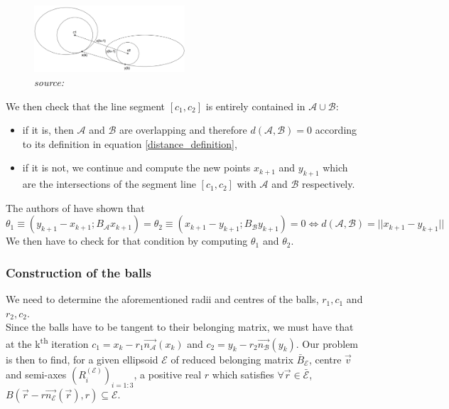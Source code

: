 \documentclass[class=report, float=false, crop=false]{standalone}
\begin{document}
\begin{figure}[h!]
\centering
\includegraphics[width=0.5\textwidth]{balls.png}
\caption{\textit{source:} \cite{lin2002distance}}
\label{balls}
\end{figure}

We then check that the line segment $[c_1,c_2]$ is entirely contained in $\mathcal{A}\cup\mathcal{B}$:
\begin{itemize}
\item if it is, then $\mathcal{A}$ and $\mathcal{B}$ are overlapping and therefore $d(\mathcal{A},\mathcal{B}) = 0$ according to its definition in equation \ref{distance_definition},
\item if it is not, we continue and compute the new points $x_{k+1}$ and $y_{k+1}$ which are the intersections of the segment line $[c_1,c_2]$ with $\mathcal{A}$ and $\mathcal{B}$ respectively.
\end{itemize}
The authors of \cite{lin2002distance} have shown that
\begin{equation}
\theta_1 \equiv  (y_{k+1} - x_{k+1};B_{\mathcal{A}}x_{k+1}) = \theta_2 \equiv (x_{k+1} - y_{k+1};B_{\mathcal{B}}y_{k+1}) = 0 \Leftrightarrow d(\mathcal{A},\mathcal{B}) = ||x_{k+1} - y_{k+1}||
\end{equation}
We then have to check for that condition by computing $\theta_1$ and $\theta_2$.

\subsubsection{Construction of the balls}

We need to determine the aforementioned radii and centres of the balls, $r_1,c_1$ and $r_2,c_2$.\\

Since the balls have to be tangent to their belonging matrix, we must have that at the k\textsuperscript{th} iteration $c_1 = x_k - r_1 \vec{n_{\mathcal{A}}}(x_k)$ and $c_2 = y_k - r_2 \vec{n_{\mathcal{B}}}(y_k)$. Our problem is then to find, for a given ellipsoid $\mathcal{E}$ of reduced belonging matrix $\bar{B}_{\mathcal{E}}$, centre $\vec{v}$ and semi-axes $(R_i^{(\mathcal{E})})_{i=1:3}$, a positive real $r$ which satisfies $\forall \vec{r} \in \bar{\mathcal{E}}$, $B(\vec{r} - r\vec{n_{\mathcal{E}}}(\vec{r}),r) \subseteq \mathcal{E}$.\\
\end{document}
